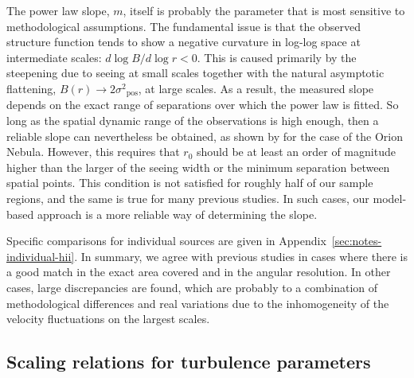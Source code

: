 \documentclass[fleqn,usenatbib, useAMS, a4paper]{mnras}
\newcommand\pos{\ensuremath{_{\mathrm{pos}}}}
\begin{document}
The power law slope, \(m\), itself is probably the parameter that
is most sensitive to methodological assumptions.
The fundamental issue is that the observed structure function tends to
show a negative curvature in log-log space at intermediate scales:
\(d\log B/ d\log r < 0\).
This is caused primarily by the steepening due to seeing at small scales
together with the natural asymptotic flattening, 
\(B(r) \to 2 \sigma^2\pos\), at large scales.
As a result, the measured slope depends on the exact range of
separations over which the power law is fitted.
So long as the spatial dynamic range of the observations is high enough,
then a reliable slope can nevertheless be obtained,
as shown by \citet{arthur2016turbulence} for the case of the Orion Nebula.
However, this requires that \(r_0\) should be at least an order of
magnitude higher than the larger of the seeing width
or the minimum separation between spatial points.
This condition is not satisfied for roughly half of our sample regions,
and the same is true for many previous studies.
In such cases, our model-based approach is a more reliable way of
determining the slope. 

Specific comparisons for individual sources are given
in Appendix~\ref{sec:notes-individual-hii}.
In summary, we agree with previous studies in cases where there
is a good match in the exact area covered and in the angular resolution.
In other cases, large discrepancies are found,
which are probably to a combination of methodological differences
and real variations due to the inhomogeneity of the
velocity fluctuations on the largest scales.

\subsection{Scaling relations for turbulence parameters}\label{sec:scaling-relations}
\end{document}
